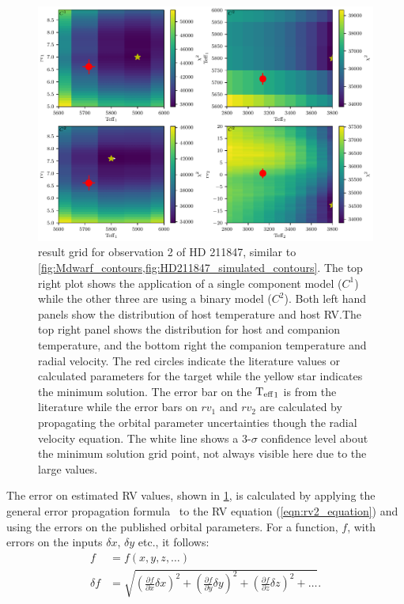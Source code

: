 \begin{figure}
    \centering
    \includegraphics[width=0.7\linewidth]{figures/companion_recovery/HD211847_result_pcolors}
    \caption{\textchisquared{} result grid for observation 2 of {HD 211847}, similar to \cref{fig:Mdwarf_contours,fig:HD211847_simulated_contours}.
    The top right plot shows the application of a single component model (\(C^1\)) while the other three are using a binary model (\(C^2\)).
    Both left hand panels show the distribution of host temperature and host {RV}.\@ The top right panel shows the distribution for host and companion temperature, and the bottom right the companion temperature and radial velocity.
    The red circles indicate the literature values or calculated parameters for the target while the yellow star indicates the minimum \textchisquared{} solution.
    The error bar on the \({\textrm{T}_{\mathrm{eff}}}_{1}\) is from the literature while the error bars on \({rv}_1\) and \({rv}_2\) are calculated by propagating the orbital parameter uncertainties though the radial velocity equation.
    The white line shows a 3-\(\sigma\) confidence level about the minimum \textchisquared{} solution grid point, not always visible here due to the large \textchisquared{} values.}
    \label{fig:HD211847_result_contours}
\end{figure}

The error on estimated {RV} values, shown in \cref{fig:HD211847_result_contours}, is calculated by applying the general error propagation formula~\citep{ku_notes_1966} to the RV equation (\cref{eqn:rv2_equation}) and using the errors on the published orbital parameters.
For a function, \(f\), with errors on the inputs \(\delta x\), \(\delta y\) etc., it follows:
\begin{align}
f &= f(x, y, z, \ldots)\\
\delta f &= \sqrt{{\left( \frac{\partial f}{\partial x} \delta x\right)}^2 + {\left(\frac{\partial f}{\partial y} \delta y\right)}^2 + {\left(\frac{\partial f}{\partial z} \delta z\right)}^2 + \ldots}.
\end{align}


